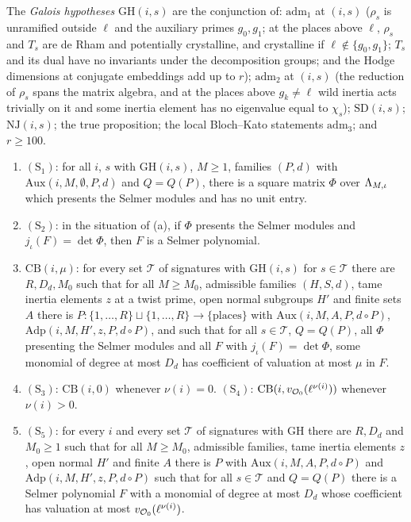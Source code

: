 \begin{definition}\label{pf:baselat1:def:galside}
The \emph{Galois hypotheses} $\mathrm{GH}(i,s)$ are the conjunction of: $\mathrm{adm}_1$ at $(i,s)$ ($\rho_s$ is
unramified outside $\ell$ and the auxiliary primes $g_0,g_1$; at the places above $\ell$, $\rho_s$ and $T_s$ are de
Rham and potentially crystalline, and crystalline if $\ell\notin\{g_0,g_1\}$; $T_s$ and its dual have no invariants
under the decomposition groups; and the Hodge dimensions at conjugate embeddings add up to $r$); $\mathrm{adm}_2$ at $(i,s)$ (the reduction of
$\rho_s$ spans the matrix algebra, and at the places above $g_k\ne\ell$ wild inertia acts trivially on it and some
inertia element has no eigenvalue equal to $\chi_s$); $\mathrm{SD}(i,s)$; $\mathrm{NJ}(i,s)$; the true
proposition; the local Bloch--Kato statements $\mathrm{adm}_3$; and $r\ge100$.
\begin{enumerate}[label=(\alph*)]
\item $(\mathrm{S}_1)$: for all $i$, $s$ with $\mathrm{GH}(i,s)$, $M\ge1$, families $(P,d)$ with
  $\mathrm{Aux}(i,M,\emptyset,P,d)$ and $Q=Q(P)$, there is a square matrix $\Phi$ over
  $\Lambda_{M,\iota}$ which presents the Selmer modules and has no unit entry.
\item $(\mathrm{S}_2)$: in the situation of (a), if $\Phi$ presents the Selmer modules and
  $j_\iota(F)=\det\Phi$, then $F$ is a Selmer polynomial.
\item $\mathrm{CB}(i,\mu)$: for every set $\mathcal T$ of signatures with $\mathrm{GH}(i,s)$ for $s\in\mathcal T$
  there are $R,D_d,M_0$ such that for all $M\ge M_0$, admissible families $(H,S,d)$, tame inertia elements $z$ at a
  twist prime, open normal subgroups $H'$ and finite sets $A$ there is $P\colon\{1,\dots,R\}\sqcup\{1,\dots,R\}\to
  \{\text{places}\}$ with $\mathrm{Aux}(i,M,A,P,d\circ P)$, $\mathrm{Adp}(i,M,H',z,P,d\circ P)$, and such that for
  all $s\in\mathcal T$, $Q=Q(P)$, all $\Phi$ presenting the Selmer modules and all $F$ with
  $j_\iota(F)=\det\Phi$, some monomial of degree at most $D_d$ has coefficient of valuation at most $\mu$ in $F$.
\item $(\mathrm{S}_3)$: $\mathrm{CB}(i,0)$ whenever $\nu(i)=0$. $(\mathrm{S}_4)$:
  $\mathrm{CB}(i,v_{\mathcal O_0}(\ell^{\nu(i)}))$ whenever $\nu(i)>0$.
\item $(\mathrm{S}_5)$: for every $i$ and every set $\mathcal T$ of signatures with
  $\mathrm{GH}$ there are $R,D_d$ and $M_0\ge1$ such that for all $M\ge M_0$, admissible families, tame inertia
  elements $z$, open normal $H'$ and finite $A$ there is $P$ with $\mathrm{Aux}(i,M,A,P,d\circ P)$ and
  $\mathrm{Adp}(i,M,H',z,P,d\circ P)$ such that for all $s\in\mathcal T$ and $Q=Q(P)$ there is a
  Selmer polynomial $F$ with a monomial of degree at most $D_d$ whose coefficient has valuation at most
  $v_{\mathcal O_0}(\ell^{\nu(i)})$.
\end{enumerate}
%
%
\end{definition}

